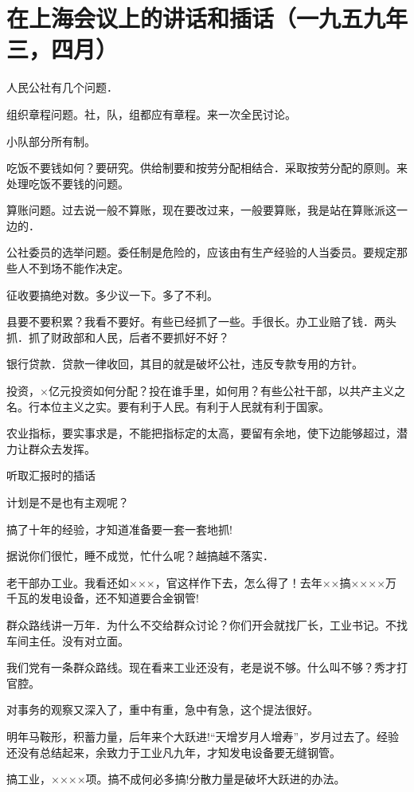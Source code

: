\section[在上海会议上的讲话和插话（一九五九年三，四月）]{在上海会议上的讲话和插话（一九五九年三，四月）}


人民公社有几个问题．

组织章程问题。社，队，组都应有章程。来一次全民讨论。

小队部分所有制。

吃饭不要钱如何？要研究。供给制要和按劳分配相结合．采取按劳分配的原则。来处理吃饭不要钱的问题。

算账问题。过去说一般不算账，现在要改过来，一般要算账，我是站在算账派这一边的．

公社委员的选举问题。委任制是危险的，应该由有生产经验的人当委员。要规定那些人不到场不能作决定。

征收要搞绝对数。多少议一下。多了不利。

县要不要积累？我看不要好。有些已经抓了一些。手很长。办工业赔了钱．两头抓．抓了财政部和人民，后者不要抓好不好？

银行贷款．贷款一律收回，其目的就是破坏公社，违反专款专用的方针。

投资，×亿元投资如何分配？投在谁手里，如何用？有些公社干部，以共产主义之名。行本位主义之实。要有利于人民。有利于人民就有利于国家。

农业指标，要实事求是，不能把指标定的太高，要留有余地，使下边能够超过，潜力让群众去发挥。

听取汇报时的插话

计划是不是也有主观呢？

搞了十年的经验，才知道准备要一套一套地抓!

据说你们很忙，睡不成觉，忙什么呢？越搞越不落实．

老干部办工业。我看还如×××，官这样作下去，怎么得了！去年××搞××××万千瓦的发电设备，还不知道要合金钢管!

群众路线讲一万年．为什么不交给群众讨论？你们开会就找厂长，工业书记。不找车间主任。没有对立面。

我们党有一条群众路线。现在看来工业还没有，老是说不够。什么叫不够？秀才打官腔。

对事务的观察又深入了，重中有重，急中有急，这个提法很好。

明年马鞍形，积蓄力量，后年来个大跃进!“天增岁月人增寿”，岁月过去了。经验还没有总结起来，余致力于工业凡九年，才知发电设备要无缝钢管。

搞工业，××××项。搞不成何必多搞!分散力量是破坏大跃进的办法。

